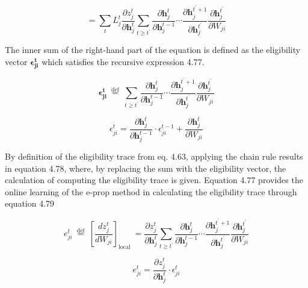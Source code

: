\documentclass[12pt]{report}
\begin{document}
\begin{equation}
    =\sum_{t}L_{j}^{t} \frac{\partial z_{j}^{t}}{\partial \mathbf{h}_{j}^{t}}\sum_{t\geq t^\prime}\frac{\partial \mathbf{h}_{j}^{t}}{\partial \mathbf{h}_{j}^{t-1}} \cdots \frac{\partial \mathbf{h}_{j}^{t^\prime + 1}}{\partial \mathbf{h}_{j}^{t^\prime}} \frac{\partial \mathbf{h}_{j}^{t^\prime}}{\partial W_{j i}} 
\end{equation}

\medskip
The inner sum of the right-hand part of the equation is defined as the eligibility vector \(\mathbf{\epsilon_{ji}^t}\) which satisfies the recursive expression 4.77. 

\begin{equation}
    \mathbf{\epsilon_{ji}^t} \stackrel{\text { def }}{=} \sum_{t\geq t^\prime}\frac{\partial \mathbf{h}_{j}^{t}}{\partial \mathbf{h}_{j}^{t-1}} \cdots \frac{\partial \mathbf{h}_{j}^{t^\prime + 1}}{\partial \mathbf{h}_{j}^{t^\prime}} \frac{\partial \mathbf{h}_{j}^{t^\prime}}{\partial W_{j i}}
\end{equation}

\begin{equation}
    \epsilon_{j i}^{t}=\frac{\partial \mathbf{h}_{j}^{t}}{\partial \mathbf{h}_{j}^{t-1}} \cdot \epsilon_{j i}^{t-1}+\frac{\partial \mathbf{h}_{j}^{t}}{\partial W_{j i}}
\end{equation}

By definition of the eligibility trace from eq. 4.63, applying the chain rule results in equation 4.78, where, by replacing the sum with the eligibility vector, the calculation of computing the eligibility trace is given. Equation 4.77 provides the online learning of the e-prop method in calculating the eligibility trace through equation 4.79

\begin{equation}
    e_{j i}^{t} \stackrel{\text { def }}{=}\left[\frac{d z_{j}^{t}}{d W_{j i}}\right]_{\text {local }} = \frac{\partial z_j^t}{\partial \mathbf{h}_j^t}\sum_{t\geq t^\prime}\frac{\partial \mathbf{h}_{j}^{t}}{\partial \mathbf{h}_{j}^{t-1}} \cdots \frac{\partial \mathbf{h}_{j}^{t^\prime + 1}}{\partial \mathbf{h}_{j}^{t^\prime}} \frac{\partial \mathbf{h}_{j}^{t^\prime}}{\partial W_{j i}}
\end{equation}

\medskip
\begin{equation}
    e_{j i}^{t} = \frac{\partial z_j^t}{\partial \mathbf{h}_j^t} \cdot \epsilon_{j i}^{t}
\end{equation}
\end{document}
